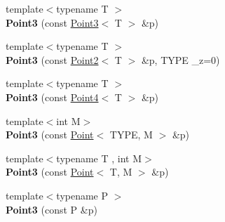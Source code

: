 \begin{Indent}
\begin{DoxyCompactItemize}
{\footnotesize template$<$typename T $>$ }\\{\bfseries Point3} (const \mbox{\hyperlink{classcy_1_1_point3}{Point3}}$<$ T $>$ \&p)
\item 
\mbox{\label{classcy_1_1_point3_a1c1a88c895fbf9ee70dc219251f13447}} 
{\footnotesize template$<$typename T $>$ }\\{\bfseries Point3} (const \mbox{\hyperlink{classcy_1_1_point2}{Point2}}$<$ T $>$ \&p, T\+Y\+PE \+\_\+z=0)
\item 
\mbox{\label{classcy_1_1_point3_adcbfbc3f5264feed02dc445022f66057}} 
{\footnotesize template$<$typename T $>$ }\\{\bfseries Point3} (const \mbox{\hyperlink{classcy_1_1_point4}{Point4}}$<$ T $>$ \&p)
\item 
\mbox{\label{classcy_1_1_point3_a2ac8a350b7eb8e14ec2a00f5798b8785}} 
{\footnotesize template$<$int M$>$ }\\{\bfseries Point3} (const \mbox{\hyperlink{classcy_1_1_point}{Point}}$<$ T\+Y\+PE, M $>$ \&p)
\item 
\mbox{\label{classcy_1_1_point3_af38eb0e39863bb6f9b1b053c270ce748}} 
{\footnotesize template$<$typename T , int M$>$ }\\{\bfseries Point3} (const \mbox{\hyperlink{classcy_1_1_point}{Point}}$<$ T, M $>$ \&p)
\item 
\mbox{\label{classcy_1_1_point3_a530917076eea038e65ebade847bbf094}} 
{\footnotesize template$<$typename P $>$ }\\{\bfseries Point3} (const P \&p)
\end{DoxyCompactItemize}
\end{Indent}
